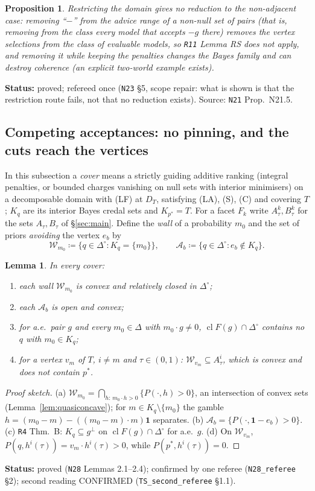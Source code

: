 \documentclass[11pt]{article}
\newtheorem{lemma}[theorem]{Lemma}
\newtheorem{proposition}[theorem]{Proposition}
\theoremstyle{definition}
\theoremstyle{remark}
\newcommand{\one}{\mathbf 1}
\newcommand{\Di}{\Delta^{\circ}}
\newcommand{\cl}{\operatorname{cl}}
\newcommand{\src}[1]{\texttt{#1}}
\newcommand{\status}[1]{\par\smallskip\noindent\textbf{Status:} #1\par\smallskip}
\begin{document}
\begin{proposition}\label{prop:noWLOG}
Restricting the domain gives no reduction to the non-adjacent case: removing ``$-$'' from the advice range of a non-null set of pairs (that is, removing from the class every model that accepts $-g$ there) removes the vertex selections from the class of evaluable models, so \src{R11} Lemma RS does not apply, and removing it while keeping the penalties changes the Bayes family and can destroy coherence (an explicit two-world example exists).
\end{proposition}
\status{proved; refereed once (\src{N23} \S5, scope repair: what is shown is that the restriction route fails, not that no reduction exists). Source: \src{N21} Prop.~N21.5.}

\subsection{Competing acceptances: no pinning, and the cuts reach the vertices}\label{sec:general-N28}

In this subsection a \emph{cover} means a strictly guiding additive ranking (integral penalties, or bounded charges vanishing on null sets with interior minimisers) on a decomposable domain with (LF) at $D_T$, satisfying (LA), (S), (C) and covering $T$; $K_q$ are its interior Bayes credal sets and $K_{p^*}=T$. For a facet $F_k$ write $A^k_\tau,B^k_\tau$ for the sets $A_\tau,B_\tau$ of \S\ref{sec:main}. Define the \emph{wall} of a probability $m_0$ and the set of priors \emph{avoiding} the vertex $e_b$ by
\[
\mathcal W_{m_0}\coloneqq\{q\in\Di:K_q=\{m_0\}\},\qquad \mathcal A_b\coloneqq\{q\in\Di:e_b\notin K_q\}.
\]

\begin{lemma}\label{lem:walls}
In every cover:
\begin{enumerate}[leftmargin=*,label=(\alph*)]
\item each wall $\mathcal W_{m_0}$ is convex and relatively closed in $\Di$;
\item each $\mathcal A_b$ is open and convex;
\item for a.e.\ pair $g$ and every $m_0\in\Delta$ with $m_0\cdot g\ne0$, $\cl F(g)\cap\Di$ contains no $q$ with $m_0\in K_q$;
\item for a vertex $v_m$ of $T$, $i\ne m$ and $\tau\in(0,1)$: $\mathcal W_{v_m}\subseteq A^i_\tau$, which is convex and does not contain $p^*$.
\end{enumerate}
\end{lemma}
\begin{proof}[Proof sketch]
(a) $\mathcal W_{m_0}=\bigcap_{h:\,m_0\cdot h>0}\{P(\cdot,h)>0\}$, an intersection of convex sets (Lemma~\ref{lem:quasiconcave}); for $m\in K_q\setminus\{m_0\}$ the gamble $h=(m_0-m)-((m_0-m)\cdot m)\one$ separates. (b) $\mathcal A_b=\{P(\cdot,\one-e_b)>0\}$. (c) \src{R4} Thm.~B: $K_q\subseteq g^\perp$ on $\cl F(g)\cap\Di$ for a.e.\ $g$. (d) On $\mathcal W_{v_m}$, $P(q,h^i(\tau))=v_m\cdot h^i(\tau)>0$, while $P(p^*,h^i(\tau))=0$.
\end{proof}
\status{proved (\src{N28} Lemmas 2.1--2.4); confirmed by one referee (\src{N28\_referee} \S2); second reading CONFIRMED (\src{TS\_second\_referee} \S1.1).}
\end{document}
